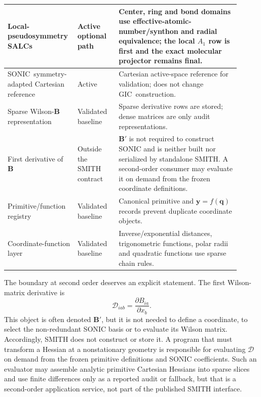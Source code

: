 \documentclass[journal=jctcce,manuscript=article,layout=traditional]{achemso}
\newcommand{\SONIC}{SONIC}
\newcommand{\GIC}{GIC}
\newcommand{\Bmat}{\mathbf{B}}
\newcommand{\q}{\mathbf{q}}
\newcommand{\y}{\mathbf{y}}
\theoremstyle{definition}
\begin{document}
\begin{table}[p]
\begin{tabular}{@{}p{0.24\linewidth}p{0.17\linewidth}p{0.50\linewidth}@{}}
\midrule
Local-pseudosymmetry SALCs & Active optional path & Center, ring and bond domains use effective-atomic-number/synthon and radial equivalence; the local \(A_1\) row is first and the exact molecular projector remains final. \\
\midrule
\SONIC\ symmetry-adapted Cartesian reference & Active & Cartesian active-space reference for validation; does not change \GIC\ construction. \\
\midrule
Sparse Wilson-\(\Bmat\) representation & Validated baseline & Sparse derivative rows are stored; dense matrices are only audit representations. \\
\midrule
First derivative of \(\Bmat\) & Outside the SMITH contract & \(\Bmat'\) is not required to construct SONIC and is neither built nor serialized by standalone SMITH.  A second-order consumer may evaluate it on demand from the frozen coordinate definitions. \\
\midrule
Primitive/function registry & Validated baseline & Canonical primitive and \(\y=f(\q)\) records prevent duplicate coordinate objects. \\
\midrule
Coordinate-function layer & Validated baseline & Inverse/exponential distances, trigonometric functions, polar radii and quadratic functions use sparse chain rules. \\
\bottomrule
\end{tabular}
\end{table}

The boundary at second order deserves an explicit statement.  The first
Wilson-matrix derivative is
\begin{equation}
 \mathcal D_{iab}=\frac{\partial B_{ia}}{\partial x_b}.
 \label{eq:sparse-b-first-derivative}
\end{equation}
This object is often denoted \(\Bmat'\), but it is not needed to define a
coordinate, to select the non-redundant SONIC basis or to evaluate its Wilson
matrix.  Accordingly, SMITH does not construct or store it.  A program that
must transform a Hessian at a nonstationary geometry is responsible for
evaluating \(\mathcal D\) on demand from the frozen primitive definitions and
SONIC coefficients.  Such an evaluator may assemble analytic primitive
Cartesian Hessians into sparse slices and use finite differences only as a
reported audit or fallback, but that is a second-order application service,
not part of the published SMITH interface.
\end{document}

